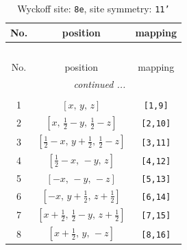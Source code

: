 \documentclass[fleqn,8pt]{jsarticle}
\begin{document}
\renewcommand{\arraystretch}{1.2}
\begin{longtable}{ccc}
\caption{Wyckoff site: {\tt 8e}, site symmetry: {\tt 11'}}
 \\
 \hline \hline
No. & position & mapping \\ \hline \endfirsthead

\multicolumn{2}{l}{\tablename\ \thetable{}} \\
 \hline \hline
No. & position & mapping \\ \hline \endhead

 \hline \hline
\multicolumn{2}{r}{\footnotesize\it continued ...} \\ \endfoot

 \hline \hline
\multicolumn{2}{r}{} \\ \endlastfoot

1 & $\left[ x,\, y,\, z \right]$ & {\tt [1,9]} \\ \hline
2 & $\left[ x,\, \frac{1}{2} - y,\, \frac{1}{2} - z \right]$ & {\tt [2,10]} \\ \hline
3 & $\left[ \frac{1}{2} - x,\, y + \frac{1}{2},\, \frac{1}{2} - z \right]$ & {\tt [3,11]} \\ \hline
4 & $\left[ \frac{1}{2} - x,\, - y,\, z \right]$ & {\tt [4,12]} \\ \hline
5 & $\left[ - x,\, - y,\, - z \right]$ & {\tt [5,13]} \\ \hline
6 & $\left[ - x,\, y + \frac{1}{2},\, z + \frac{1}{2} \right]$ & {\tt [6,14]} \\ \hline
7 & $\left[ x + \frac{1}{2},\, \frac{1}{2} - y,\, z + \frac{1}{2} \right]$ & {\tt [7,15]} \\ \hline
8 & $\left[ x + \frac{1}{2},\, y,\, - z \right]$ & {\tt [8,16]} \\
\end{longtable}
\end{document}
